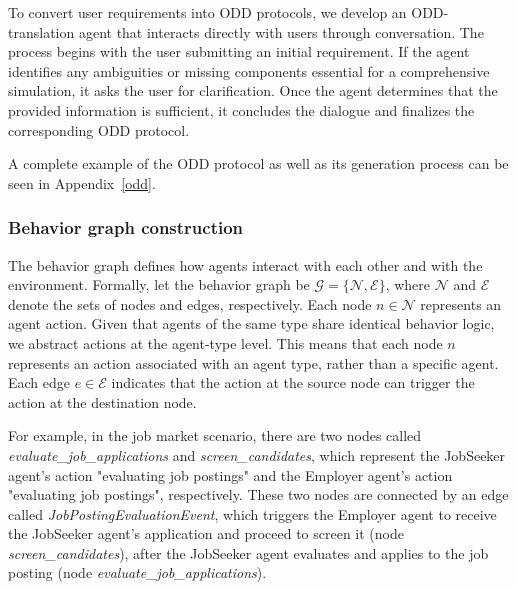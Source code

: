 \documentclass{article}
\theoremstyle{definition}
\theoremstyle{theorem}
\theoremstyle{proof}
\theoremstyle{remark}
\begin{document}
    To convert user requirements into ODD protocols, we develop an ODD-translation agent that interacts directly with users through conversation.
    The process begins with the user submitting an initial requirement.
    If the agent identifies any ambiguities or missing components essential for a comprehensive simulation, it asks the user for clarification.
    Once the agent determines that the provided information is sufficient, it concludes the dialogue and finalizes the corresponding ODD protocol. 

    A complete example of the ODD protocol as well as its generation process can be seen in Appendix~\ref{odd}. 

   \subsubsection{Behavior graph construction}
    The behavior graph defines how agents interact with each other and with the environment. Formally, let the behavior graph be $\mathcal{G} = \{\mathcal{N}, \mathcal{E}\}$, where $\mathcal{N}$ and $\mathcal{E}$ denote the sets of nodes and edges, respectively. Each node $n \in \mathcal{N}$ represents an agent action. 
    Given that agents of the same type share identical behavior logic, we abstract actions at the agent-type level. This means that each node $n$ represents an action associated with an agent type, rather than a specific agent.
    Each edge $e \in \mathcal{E}$ indicates that the action at the source node can trigger the action at the destination node.
    
    For example, in the job market scenario, there are two nodes called \textit{evaluate\_job\_applications} and \textit{screen\_candidates}, which represent the JobSeeker agent's action "evaluating job postings" and the Employer agent's action "evaluating job postings", respectively.
    These two nodes are connected by an edge called \textit{JobPostingEvaluationEvent}, which triggers the Employer agent to receive the JobSeeker agent's application and proceed to screen it (node \textit{screen\_candidates}), after the JobSeeker agent evaluates and applies to the job posting (node \textit{evaluate\_job\_applications}).
    
    
    
\end{document}
